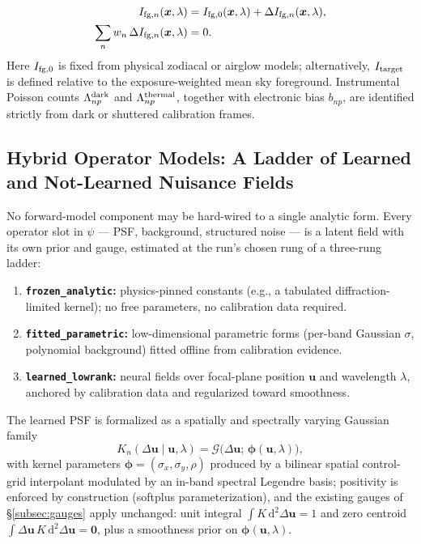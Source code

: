 \documentclass[11pt,a4paper]{article}
\begin{document}
\begin{enumerate}
\begin{equation}
\begin{aligned}
    I_{{\rm fg}, n}(\boldsymbol{x}, \lambda)
        &= I_{{\rm fg}, 0}(\boldsymbol{x}, \lambda)
           + \Delta I_{{\rm fg}, n}(\boldsymbol{x}, \lambda), \\
    \sum_n w_n \, \Delta I_{{\rm fg}, n}(\boldsymbol{x}, \lambda) &= 0.
    \end{aligned}
    \end{equation}
    Here $I_{{\rm fg}, 0}$ is fixed from physical zodiacal or airglow models;
    alternatively, $I_{\rm target}$ is defined relative to the
    exposure-weighted mean sky foreground.  Instrumental Poisson counts
    $\Lambda_{np}^{\rm dark}$ and $\Lambda_{np}^{\rm thermal}$, together with
    electronic bias $b_{np}$, are identified strictly from dark or shuttered
    calibration frames.
\end{enumerate}

\subsection{Hybrid Operator Models: A Ladder of Learned and Not-Learned Nuisance Fields}
\label{subsec:hybrid_operators}
No forward-model component may be hard-wired to a single analytic form. Every operator slot in $\psi$ --- PSF, background, structured noise --- is a latent field with its own prior and gauge, estimated at the run's chosen rung of a three-rung ladder:
\begin{enumerate}
    \item \textbf{\texttt{frozen\_analytic}:} physics-pinned constants (e.g., a tabulated diffraction-limited kernel); no free parameters, no calibration data required.
    \item \textbf{\texttt{fitted\_parametric}:} low-dimensional parametric forms (per-band Gaussian $\sigma$, polynomial background) fitted offline from calibration evidence.
    \item \textbf{\texttt{learned\_lowrank}:} neural fields over focal-plane position $\boldsymbol{u}$ and wavelength $\lambda$, anchored by calibration data and regularized toward smoothness.
\end{enumerate}
The learned PSF is formalized as a spatially and spectrally varying Gaussian family
\begin{equation}
K_n(\Delta\boldsymbol{u} \mid \boldsymbol{u}, \lambda) = \mathcal{G}\big(\Delta\boldsymbol{u};\, \boldsymbol{\phi}(\boldsymbol{u}, \lambda)\big),
\end{equation}
with kernel parameters $\boldsymbol{\phi} = (\sigma_x, \sigma_y, \rho)$ produced by a bilinear spatial control-grid interpolant modulated by an in-band spectral Legendre basis; positivity is enforced by construction (softplus parameterization), and the existing gauges of \S\ref{subsec:gauges} apply unchanged: unit integral $\int K\,\mathrm{d}^2\Delta\boldsymbol{u} = 1$ and zero centroid $\int \Delta\boldsymbol{u}\, K\,\mathrm{d}^2\Delta\boldsymbol{u} = \mathbf{0}$, plus a smoothness prior on $\boldsymbol{\phi}(\boldsymbol{u}, \lambda)$.
\end{document}

